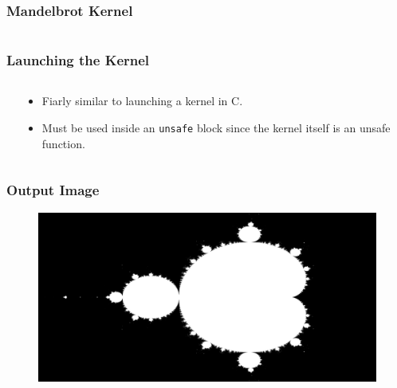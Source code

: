 \documentclass[aspectratio=169]{beamer}
\begin{document}
\begin{frame}
	\frametitle{Mandelbrot Kernel}
	\begin{columns}
		\begin{column}{0.5\textwidth}
			
		\end{column}
		\begin{column}{0.45\textwidth}
			
		\end{column}
	\end{columns}
\end{frame}

\begin{frame}
	\frametitle{Launching the Kernel}
	\begin{columns}
		\begin{column}{0.55\textwidth}
			
		\end{column}
		\begin{column}{0.3\textwidth}
            \begin{itemize}
                \item Fiarly similar to launching a kernel in C.
                \item Must be used inside an \Verb|unsafe| block since the kernel itself is an unsafe function.
            \end{itemize}
		\end{column}
	\end{columns}
\end{frame}

\begin{frame}
	\frametitle{Output Image}
    \begin{figure}[H]
        \centering
        \includegraphics[width=\textwidth]{./figures/mandelbrot.png}
    \end{figure}
\end{frame}
\end{document}
